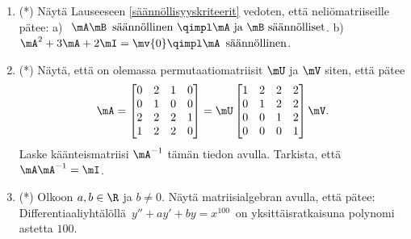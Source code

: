 \begin{enumerate}
\item (*) Näytä Lauseeseen \ref{säännöllisyyskriteerit} vedoten, että neliömatriiseille
pätee: \vspace{1mm}\newline
a)\,\ $\mA\mB\,\ \text{säännöllinen}\ \qimpl \mA\ \text{ja}\ \mB\ \text{säännölliset}$.\newline
b)\,\ $\mA^2+3\mA+2\mI=\mv{0} \qimpl \mA\,\ \text{säännöllinen}$.

\item (*)
Näytä, että on olemassa permutaatiomatriisit $\mU$ ja $\mV$ siten, että pätee
\[
\mA=\begin{bmatrix} 0&2&1&0\\0&1&0&0\\2&2&2&1\\1&2&2&0 \end{bmatrix}
   =\mU \begin{bmatrix} 1&2&2&2\\0&1&2&2\\0&0&1&2\\0&0&0&1 \end{bmatrix} \mV.
\]
Laske käänteismatriisi $\mA^{-1}$ tämän tiedon avulla. Tarkista, että $\mA\mA^{-1}=\mI$.

\item (*)
Olkoon $a,b\in\R$ ja $b \neq 0$. Näytä matriisialgebran avulla, että pätee: 
Differentiaaliyhtälöllä $\,y''+ay'+by=x^{100}\,$ on yksittäisratkaisuna polynomi astetta
$100$.
 
\end{enumerate}


